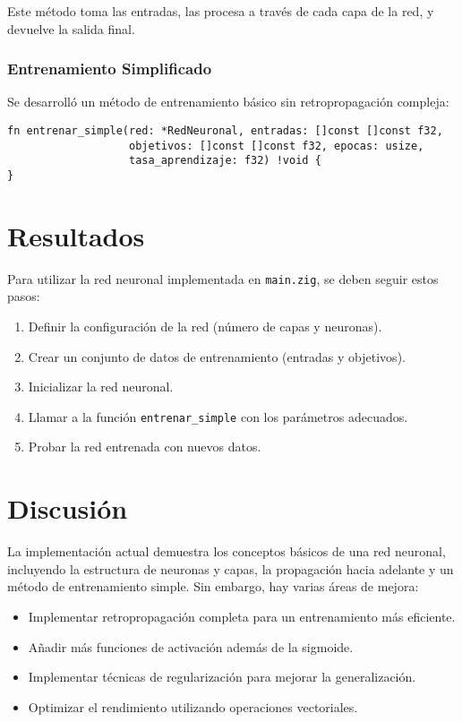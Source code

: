 \documentclass[twocolumn]{article}
\begin{document}
Este método toma las entradas, las procesa a través de cada capa de la red, y devuelve la salida final.

\subsubsection{Entrenamiento Simplificado}
Se desarrolló un método de entrenamiento básico sin retropropagación compleja:

\begin{lstlisting}[style=customcode]
fn entrenar_simple(red: *RedNeuronal, entradas: []const []const f32, 
                   objetivos: []const []const f32, epocas: usize, 
                   tasa_aprendizaje: f32) !void {
}
\end{lstlisting}

\section{Resultados}
Para utilizar la red neuronal implementada en \texttt{main.zig}, se deben seguir estos pasos:

\begin{enumerate}
    \item Definir la configuración de la red (número de capas y neuronas).
    \item Crear un conjunto de datos de entrenamiento (entradas y objetivos).
    \item Inicializar la red neuronal.
    \item Llamar a la función \texttt{entrenar\_simple} con los parámetros adecuados.
    \item Probar la red entrenada con nuevos datos.
\end{enumerate}

\section{Discusión}
La implementación actual demuestra los conceptos básicos de una red neuronal, incluyendo la estructura de neuronas y capas, la propagación hacia adelante y un método de entrenamiento simple. Sin embargo, hay varias áreas de mejora:

\begin{itemize}
    \item Implementar retropropagación completa para un entrenamiento más eficiente.
    \item Añadir más funciones de activación además de la sigmoide.
    \item Implementar técnicas de regularización para mejorar la generalización.
    \item Optimizar el rendimiento utilizando operaciones vectoriales.
\end{itemize}
\end{document}
